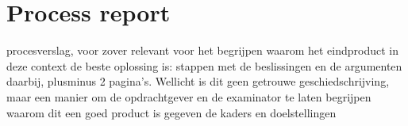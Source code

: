 \section{Process report}
procesverslag, voor zover relevant voor het begrijpen waarom het eindproduct in deze context de beste oplossing is: stappen met de beslissingen en de argumenten daarbij, plusminus 2 pagina's. Wellicht is dit geen getrouwe geschiedschrijving, maar een manier om de opdrachtgever en de examinator te laten begrijpen waarom dit een goed product is gegeven de kaders en doelstellingen

